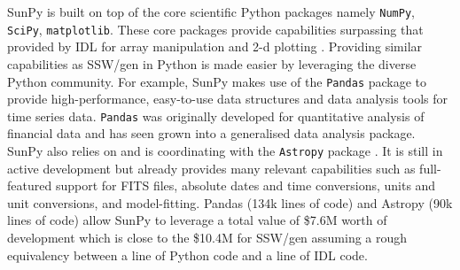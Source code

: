 SunPy is built on top of the core scientific Python packages namely 
\texttt{NumPy}, \texttt{SciPy}, \texttt{matplotlib}. These core packages 
provide capabilities surpassing that provided by IDL for array manipulation and 
2-d plotting \citep{greenfield2011}. Providing similar capabilities as SSW/gen 
in Python is made easier by leveraging the diverse Python community. For 
example, SunPy makes use of the \texttt{Pandas} package to provide 
high-performance, easy-to-use data structures and data analysis tools for time 
series data\citep{mckinney2012}. \texttt{Pandas} was originally developed for 
quantitative analysis of financial data and has seen grown into a generalised 
data analysis package. SunPy also relies on and is coordinating with the 
\texttt{Astropy} package \citep{theastropycollaboration2013}. It is still in 
active development but already provides many relevant capabilities such as 
full-featured support for FITS files, absolute dates and time conversions, 
units and unit conversions, and model-fitting. Pandas (134k lines of code) 
and Astropy (90k lines of code) allow SunPy to leverage a total value of \$7.6M 
worth of development which is close to the \$10.4M for SSW/gen assuming a rough 
equivalency between a line of Python code and a line of IDL code. 